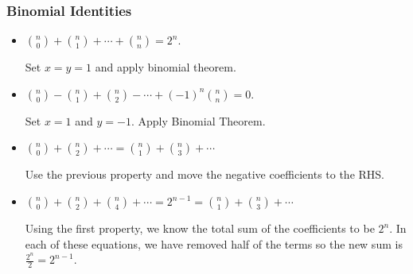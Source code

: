 \documentclass{report}
\begin{document}
\subsubsection*{Binomial Identities}

\begin{itemize}
    \item $\binom{n}{0} + \binom{n}{1} + \cdots + \binom{n}{n} = 2^n$.

          \begin{subproof}
              Set $x = y = 1$ and apply binomial theorem.
          \end{subproof}

    \item $\binom{n}{0} - \binom{n}{1} + \binom{n}{2} - \cdots + (-1)^n \binom{n}{n} = 0$.

          \begin{subproof}
              Set $x = 1$ and $y=-1$. Apply Binomial Theorem.
          \end{subproof}

    \item $\binom{n}{0} + \binom{n}{2} + \cdots = \binom{n}{1} + \binom{n}{3} + \cdots$

          \begin{subproof}
              Use the previous property and move the negative coefficients to the RHS.
          \end{subproof}

    \item $\binom{n}{0} + \binom{n}{2} + \binom{n}{4} + \cdots = 2^{n-1} = \binom{n}{1} + \binom{n}{3} + \cdots$
          \begin{subproof}
              Using the first property, we know the total sum of the coefficients to be $2^n$. In each of these
              equations, we have removed half of the terms so the new sum is $\frac{2^n}{2} = 2^{n-1}$.
          \end{subproof}
\end{itemize}
\end{document}
